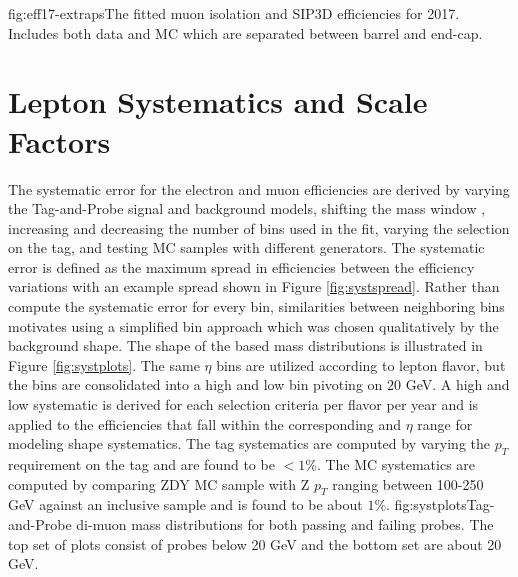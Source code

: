 
%
          {fig:eff17-extraps}{The fitted muon isolation and SIP3D efficiencies for 2017. Includes both data and MC which are separated between barrel and end-cap.  }




\FloatBarrier
\section{Lepton Systematics and Scale Factors}

The systematic error for the electron and muon efficiencies are derived by varying the Tag-and-Probe signal and background models, shifting the mass window , increasing and decreasing the number of bins used in the fit, varying the selection on the tag, and testing MC samples with different generators. The systematic error is defined as the maximum spread in efficiencies between the efficiency variations with an example spread shown in Figure \ref{fig:systspread}.  Rather than compute the systematic error for every bin, similarities between neighboring bins motivates using a simplified bin approach which was chosen qualitatively by the background shape. The shape of the \pt based mass distributions is illustrated in Figure \ref{fig:systplots}. The same $\eta$ bins are utilized according to lepton flavor, but the \pt bins are consolidated into a high and low bin pivoting on $20$ GeV. A high and low systematic is derived for each selection criteria per flavor per year and is applied to the efficiencies that fall within the corresponding \pt and $\eta$ range for modeling shape systematics. The tag systematics are computed by varying the $p_T$ requirement on the tag and are found to be $<1\%$. The MC systematics are computed by comparing ZDY MC sample with Z $p_T$ ranging between 100-250 GeV against an inclusive sample and is found to be about $1\%$. 
%
	{fig:systplots}{Tag-and-Probe di-muon mass distributions for both passing and failing probes. The top set of plots consist of probes below 20 GeV and the bottom set are about 20 GeV.}
	


